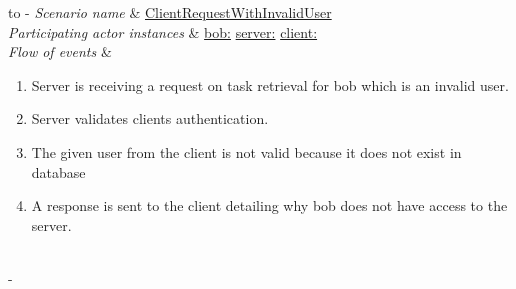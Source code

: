 %
%
\begin{table}[h!]
	\tabulinesep=1.5mm
	\begin{tabu} to 
		\tabucline[1.5pt]-
		\textit{Scenario name} & \underline{ClientRequestWithInvalidUser} \\
		\hline
		\textit{Participating actor \newline instances} & 
		\underline{bob:\invalidUser}
		\newline \underline{server:\serverside}
		\newline \underline{client:\clientside} \\
		\hline
		\textit{Flow of events} &
		\vspace{-3mm}
		\begin{enumerate}[leftmargin=*,topsep=0pt,itemsep=-1ex]
			\item Server is receiving a request on task retrieval for bob which is an invalid user.
			
			\item Server validates clients authentication. 
			
			\item The given user from the client is not valid because it does not exist in database
			
			\item A response is sent to the client detailing why bob does not have access to the server. \\
			
		\end{enumerate} \\
		\tabucline[1.5pt]-
	\end{tabu}
	\caption{Scenario when a invalid user is trying to get access to the server.}
	\label{sc:ClientRequestWithInvalidUser}
\end{table}

